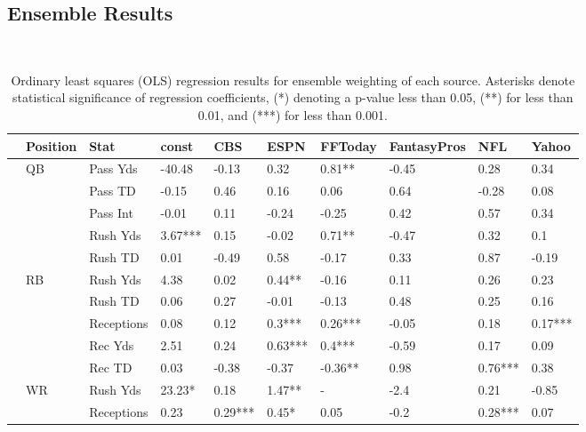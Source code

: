 \documentclass[12pt]{article}
\begin{document}
\pagebreak
\subsection{Ensemble Results}


﻿\begin{table}[H]
\caption{Ordinary least squares (OLS) regression results for ensemble weighting of each source. Asterisks denote statistical significance of regression coefficients, (*) denoting a p-value less than 0.05, (**) for less than 0.01, and (***) for less than 0.001.}
\centering
\begin{adjustbox}{width =\textwidth}
\begin{tabular}{llllllllll}
\toprule
{} & Position &        Stat &    const &      CBS &     ESPN &  FFToday & FantasyPros &      NFL &    Yahoo \\
\midrule
{} &       QB &    Pass Yds &   -40.48 &    -0.13 &     0.32 &   0.81** &       -0.45 &     0.28 &     0.34 \\
{} &          &     Pass TD &    -0.15 &     0.46 &     0.16 &     0.06 &        0.64 &    -0.28 &     0.08 \\
{} &          &    Pass Int &    -0.01 &     0.11 &    -0.24 &    -0.25 &        0.42 &     0.57 &     0.34 \\
{} &          &    Rush Yds &  3.67*** &     0.15 &    -0.02 &   0.71** &       -0.47 &     0.32 &      0.1 \\
{} &          &     Rush TD &     0.01 &    -0.49 &     0.58 &    -0.17 &        0.33 &     0.87 &    -0.19 \\
{} &       RB &    Rush Yds &     4.38 &     0.02 &   0.44** &    -0.16 &        0.11 &     0.26 &     0.23 \\
{} &          &     Rush TD &     0.06 &     0.27 &    -0.01 &    -0.13 &        0.48 &     0.25 &     0.16 \\
{} &          &  Receptions &     0.08 &     0.12 &   0.3*** &  0.26*** &       -0.05 &     0.18 &  0.17*** \\
{} &          &     Rec Yds &     2.51 &     0.24 &  0.63*** &   0.4*** &       -0.59 &     0.17 &     0.09 \\
{} &          &      Rec TD &     0.03 &    -0.38 &    -0.37 &  -0.36** &        0.98 &  0.76*** &     0.38 \\
{} &       WR &    Rush Yds &   23.23* &     0.18 &   1.47** &        - &        -2.4 &     0.21 &    -0.85 \\
{} &          &  Receptions &     0.23 &  0.29*** &    0.45* &     0.05 &        -0.2 &  0.28*** &     0.07 \\

\end{tabular}
\end{adjustbox}
\end{table}
\end{document}

